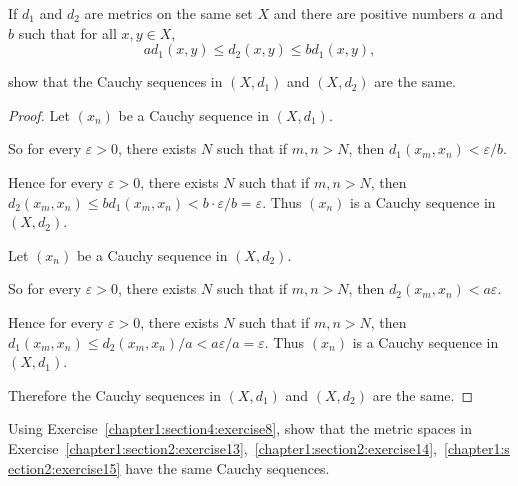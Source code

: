 \begin{exercise}\label{chapter1:section4:exercise8}
    If $d_{1}$ and $d_{2}$ are metrics on the same set $X$ and there are positive numbers $a$ and $b$ such that for all $x, y\in X$,
    \[
        ad_{1}(x, y) \leq d_{2}(x, y) \leq bd_{1}(x, y),
    \]

    show that the Cauchy sequences in $(X, d_{1})$ and $(X, d_{2})$ are the same.
\end{exercise}

\begin{proof}
    Let $(x_{n})$ be a Cauchy sequence in $(X, d_{1})$.

    So for every $\varepsilon > 0$, there exists $N$ such that if $m, n > N$, then $d_{1}(x_{m}, x_{n}) < \varepsilon/b$.

    Hence  for every $\varepsilon > 0$, there exists $N$ such that if $m, n > N$, then $d_{2}(x_{m}, x_{n}) \leq bd_{1}(x_{m}, x_{n}) < b\cdot \varepsilon/b = \varepsilon$. Thus $(x_{n})$ is a Cauchy sequence in $(X, d_{2})$.

    \bigskip

    Let $(x_{n})$ be a Cauchy sequence in $(X, d_{2})$.

    So for every $\varepsilon > 0$, there exists $N$ such that if $m, n > N$, then $d_{2}(x_{m}, x_{n}) < a\varepsilon$.

    Hence for every $\varepsilon > 0$, there exists $N$ such that if $m, n > N$, then $d_{1}(x_{m}, x_{n}) \leq d_{2}(x_{m}, x_{n})/a < a\varepsilon/a = \varepsilon$. Thus $(x_{n})$ is a Cauchy sequence in $(X, d_{1})$.

    Therefore the Cauchy sequences in $(X, d_{1})$ and $(X, d_{2})$ are the same.
\end{proof}

\begin{exercise}\label{chapter1:section4:exercise9}
    Using Exercise~\ref{chapter1:section4:exercise8}, show that the metric spaces in Exercise~\ref{chapter1:section2:exercise13},~\ref{chapter1:section2:exercise14},~\ref{chapter1:section2:exercise15} have the same Cauchy sequences.
\end{exercise}

